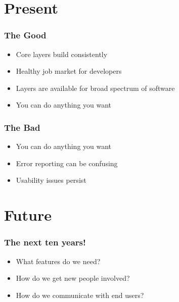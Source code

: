 \documentclass{beamer}
\begin{document}
\section{Present}

\begin{frame}
\frametitle{The Good}

\begin{itemize}
\item Core layers build consistently
\item Healthy job market for developers
\item Layers are available for broad spectrum of software
\item You can do anything you want
\end{itemize}

\end{frame}

\begin{frame}
\frametitle{The Bad}

\begin{itemize}
\item You can do anything you want
\item Error reporting can be confusing
\item Usability issues persist
\end{itemize}

\end{frame}

\section{Future}

\begin{frame}
\frametitle{The next ten years!}

\begin{itemize}
\item What features do we need?
\item How do we get new people involved?
\item How do we communicate with end users?
\end{itemize}

\end{frame}
\end{document}
